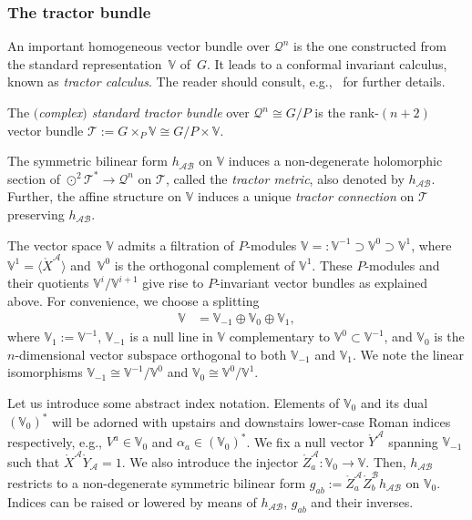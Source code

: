 \documentclass[pdftex]{sigma}
\numberwithin{equation}{section}
\newcommand{\mc} [1]{\mathcal{#1}}
\newcommand{\mr}[1] {\mathring{#1}}
\newcommand{\V} {\mathbb{V}}
\begin{document}
\subsubsection{The tractor bundle}\label{sec-tractor}
An important homogeneous vector bundle over $\mc{Q}^n$ is the one constructed from the standard representation~$\V$ of~$G$. It leads to a conformal invariant calculus, known as \emph{tractor calculus}. The reader should consult, e.g.,~\cite{Bailey1994,Curry2014} for further details.

\begin{Definition}
The \emph{$($complex$)$ standard tractor bundle} over $\mc{Q}^n \cong G/P$ is the rank-$(n+2)$ vector bundle $\mc{T} := G \times_P \V \cong G/P \times \V$.
\end{Definition}
The symmetric bilinear form $h_{\mc{A} \mc{B}}$ on $\V$ induces a non-degenerate holomorphic section of $\odot^2 \mc{T}^* \rightarrow \mc{Q}^n$ on $\mc{T}$, called the \emph{tractor metric}, also denoted by $h_{\mc{A} \mc{B}}$. Further, the af\/f\/ine structure on $\V$ induces a unique \emph{tractor connection} on $\mc{T}$ preserving $h_{\mc{A} \mc{B}}$.

The vector space $\V$ admits a f\/iltration of $P$-modules $\V =: \V^{-1} \supset \V^0 \supset \V^1$, where $\V^1 = \big\langle \mr{X}^\mc{A} \big\rangle$ and~$\V^0$ is the orthogonal complement of $\V^1$. These $P$-modules and their quotients $\V^i/\V^{i+1}$ give rise to $P$-invariant vector bundles as explained above. For convenience, we choose a splitting
\begin{align}\label{eq-split-V}
\V & = \V_{-1} \oplus \V_0 \oplus \V_1 ,
\end{align}
where $\V_1 :=\V^{-1}$, $\V_{-1}$ is a null line in $\V$ complementary to $\V^0 \subset \V^{-1}$, and $\V_0$ is the $n$-dimensional vector subspace orthogonal to both $\V_{-1}$ and $\V_1$. We note the linear isomorphisms $\V_{-1} \cong \V^{-1}/\V^0$ and $\V_0 \cong \V^0/\V^1$.

 Let us introduce some abstract index notation. Elements of $\V_0$ and its dual $(\V_0)^*$ will be adorned with upstairs and downstairs lower-case Roman indices respectively, e.g., $V^a \in \V_0$ and $\alpha_a \in (\V_0)^*$. We f\/ix a null vector $\mr{Y}^\mc{A}$ spanning $\V_{-1}$ such that $\mr{X}^\mc{A} \mr{Y}_\mc{A} =1$. We also introduce the injector $\mr{Z}^\mc{A}_a \colon \V_0 \rightarrow \V$. Then, $h_{\mc{A} \mc{B}}$ restricts to a non-degenerate symmetric bilinear form $g_{ab} := \mr{Z}^\mc{A}_a \mr{Z}^\mc{B}_b h_{\mc{A} \mc{B}}$ on $\V_0$. Indices can be raised or lowered by means of $h_{\mc{A} \mc{B}}$, $g_{ab}$ and their inverses.
\end{document}
